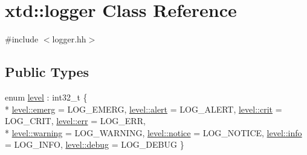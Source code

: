 \hypertarget{classxtd_1_1logger}{}\section{xtd\+:\+:logger Class Reference}
\label{classxtd_1_1logger}


{\ttfamily \#include $<$logger.\+hh$>$}

\subsection*{Public Types}
\begin{DoxyCompactItemize}
\item 
enum \hyperlink{classxtd_1_1logger_a250ce2f143da181d7149a1556da2a6f1}{level} \+: int32\+\_\+t \{ \\*
\hyperlink{classxtd_1_1logger_a250ce2f143da181d7149a1556da2a6f1ae6cb8d153a4c27be572a177366bd7abc}{level\+::emerg} = L\+O\+G\+\_\+\+E\+M\+E\+RG, 
\hyperlink{classxtd_1_1logger_a250ce2f143da181d7149a1556da2a6f1a7ed21143076d0cca420653d4345baa2f}{level\+::alert} = L\+O\+G\+\_\+\+A\+L\+E\+RT, 
\hyperlink{classxtd_1_1logger_a250ce2f143da181d7149a1556da2a6f1a5888c6a8bb862595985926d16c7dcf13}{level\+::crit} = L\+O\+G\+\_\+\+C\+R\+IT, 
\hyperlink{classxtd_1_1logger_a250ce2f143da181d7149a1556da2a6f1a56bd7107802ebe56c6918992f0608ec6}{level\+::err} = L\+O\+G\+\_\+\+E\+RR, 
\\*
\hyperlink{classxtd_1_1logger_a250ce2f143da181d7149a1556da2a6f1a7b83d3f08fa392b79e3f553b585971cd}{level\+::warning} = L\+O\+G\+\_\+\+W\+A\+R\+N\+I\+NG, 
\hyperlink{classxtd_1_1logger_a250ce2f143da181d7149a1556da2a6f1aefd2af60c8501931cb9c736b5ad74f65}{level\+::notice} = L\+O\+G\+\_\+\+N\+O\+T\+I\+CE, 
\hyperlink{classxtd_1_1logger_a250ce2f143da181d7149a1556da2a6f1acaf9b6b99962bf5c2264824231d7a40c}{level\+::info} = L\+O\+G\+\_\+\+I\+N\+FO, 
\hyperlink{classxtd_1_1logger_a250ce2f143da181d7149a1556da2a6f1aad42f6697b035b7580e4fef93be20b4d}{level\+::debug} = L\+O\+G\+\_\+\+D\+E\+B\+UG
 \}
\end{DoxyCompactItemize}
